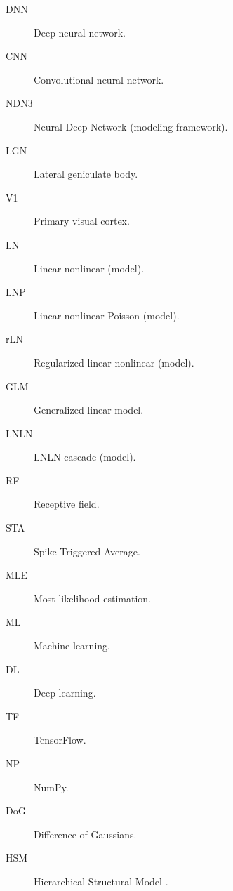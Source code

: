 
\begin{description}
	
	\item[DNN] Deep neural network.
	
	\item[CNN] Convolutional neural network.
	
	\item[NDN3] Neural Deep Network (modeling framework).
	
	\item[LGN] Lateral geniculate body.
	
	\item[V1] Primary visual cortex.
	
	\item[LN] Linear-nonlinear (model).
	
	\item[LNP] Linear-nonlinear Poisson (model).

	\item[rLN] Regularized linear-nonlinear (model).

	\item[GLM] Generalized linear model.

	\item[LNLN] LNLN cascade (model).

	\item[RF] Receptive field.

	\item[STA] Spike Triggered Average.

	\item[MLE] Most likelihood estimation.

	\item[ML] Machine learning.

	\item[DL] Deep learning.

	\item[TF] TensorFlow.

	\item[NP] NumPy.

	\item[DoG] Difference of Gaussians.

	\item[HSM] Hierarchical Structural Model \citep{antolik}.
	
\end{description}

